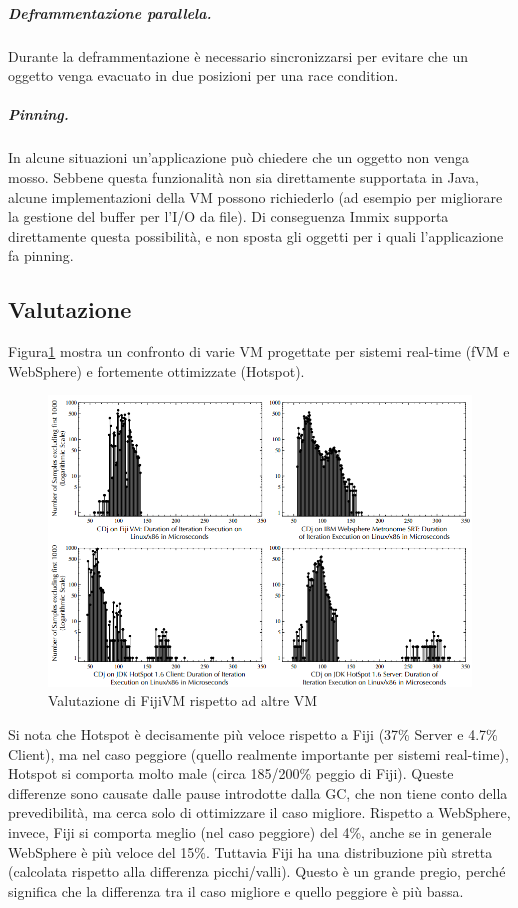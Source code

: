 \subparagraph{Deframmentazione parallela.} Durante la deframmentazione è necessario sincronizzarsi per evitare che un oggetto venga evacuato in due posizioni per una race condition. 

\subparagraph{Pinning.} In alcune situazioni un'applicazione può chiedere che un oggetto non venga mosso. Sebbene questa funzionalità non sia direttamente supportata in Java, alcune implementazioni della VM possono richiederlo (ad esempio per migliorare la gestione del buffer per l'I/O da file). Di conseguenza Immix supporta direttamente questa possibilità, e non sposta gli oggetti per i quali l'applicazione fa pinning.

\subsection{Valutazione}
Figura\ref{fig:fijicomp} mostra un confronto di varie VM progettate per sistemi real-time (fVM e WebSphere) e fortemente ottimizzate (Hotspot). 
\begin{figure}[h]
	\centering
	\includegraphics[width=0.8\linewidth]{images/fijicomp}
	\caption[Valutazione rispetto ad altre VM]{Valutazione di FijiVM rispetto ad altre VM}
	\label{fig:fijicomp}
\end{figure}

Si nota che Hotspot è decisamente più veloce rispetto a Fiji (37\% Server e 4.7\% Client), ma nel caso peggiore (quello realmente importante per sistemi real-time), Hotspot si comporta molto male (circa 185/200\% peggio di Fiji). Queste differenze sono causate dalle pause introdotte dalla GC, che non tiene conto della prevedibilità, ma cerca solo di ottimizzare il caso migliore. Rispetto a WebSphere, invece, Fiji si comporta meglio (nel caso peggiore) del 4\%, anche se in generale WebSphere è più veloce del 15\%. Tuttavia Fiji ha una distribuzione più stretta (calcolata rispetto alla differenza picchi/valli). Questo è un grande pregio, perché significa che la differenza tra il caso migliore e quello peggiore è più bassa.

